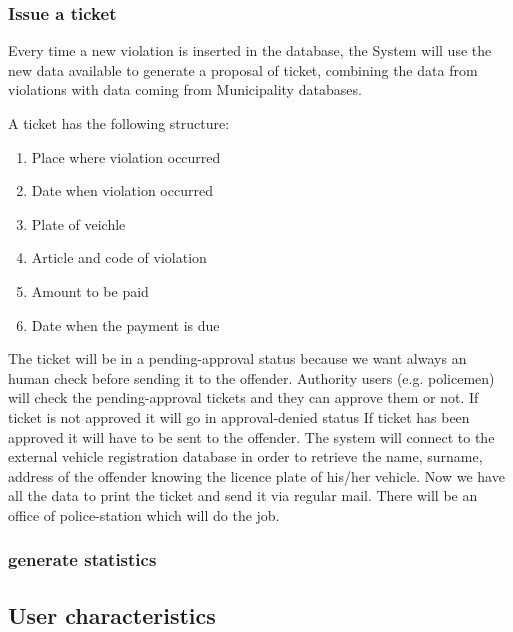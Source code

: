 \subsubsection{Issue a ticket }
Every time a new violation is inserted in the database, the System will use the new data available to generate a proposal of ticket, combining the data from violations with data coming from Municipality databases.

A ticket has the following structure:
\begin{enumerate}
  \item Place where violation occurred
  \item Date when violation occurred
  \item Plate of veichle
  \item Article and code of violation
  \item Amount to be paid
  \item Date when the payment is due
\end{enumerate}

The ticket will be in a pending-approval status because we want always an human check before sending it to the offender.
Authority users (e.g. policemen) will check the pending-approval tickets and they can approve them or not.
If ticket is not approved it will go in approval-denied status
If ticket has been approved it will have to be sent to the offender.
The system will connect to the external vehicle registration database in order to retrieve the name, surname, address of the offender knowing the licence plate of his/her vehicle.
Now we have all the data to print the ticket and send it via regular mail. There will be an office of police-station which will do the job.

\subsubsection{generate statistics}

\subsection{User characteristics }


